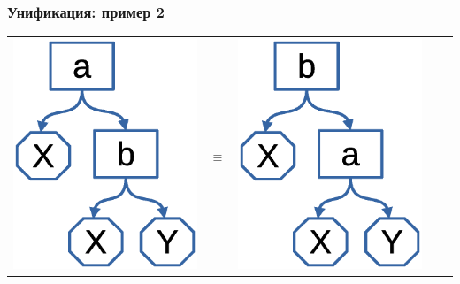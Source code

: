 \documentclass{../../slides-style}
\begin{document}
    \begin{frame}
        \frametitle{Унификация: пример 2}
    \begin{tabular}{m{25mm}cm{25mm}cm{25mm}}
    \includegraphics[scale=0.4]{term1.eps} &
    \textbf{\Huge $\equiv$} &
    \includegraphics[scale=0.4]{term2.eps} &

\end{tabular}
\end{frame}
\end{document}
